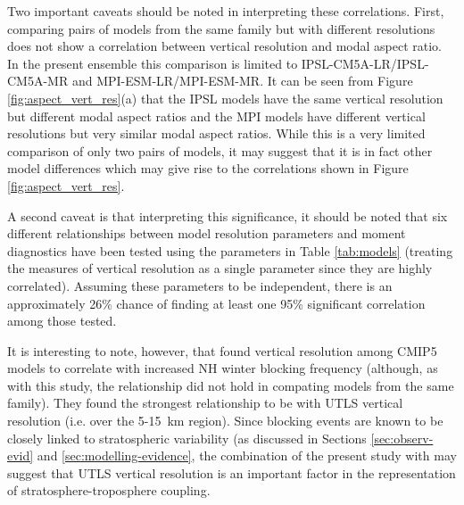 Two important caveats should be noted in interpreting these correlations. First,
comparing pairs of models from the same family but with different resolutions
does not show a correlation between vertical resolution and modal aspect
ratio. In the present ensemble this comparison is limited to
IPSL-CM5A-LR/IPSL-CM5A-MR and MPI-ESM-LR/MPI-ESM-MR. It can be seen from Figure
\ref{fig:aspect_vert_res}(a) that the IPSL models have the same vertical
resolution but different modal aspect ratios and the MPI models have different
vertical resolutions but very similar modal aspect ratios. While this is a very
limited comparison of only two pairs of models, it may suggest that it is in
fact other model differences which may give rise to the correlations shown in
Figure \ref{fig:aspect_vert_res}.

A second caveat is that interpreting this significance, it should be noted that
six different relationships between model resolution parameters and moment
diagnostics have been tested using the parameters in Table \ref{tab:models}
(treating the measures of vertical resolution as a single parameter since they
are highly correlated). Assuming these parameters to be independent, there is an
approximately 26\% chance of finding at least one 95\% significant correlation
among those tested. 

It is interesting to note, however, that \citet{Anstey2013} found vertical
resolution among CMIP5 models to correlate with increased NH winter blocking
frequency (although, as with this study, the relationship did not hold in
compating models from the same family). They found the strongest relationship to
be with UTLS vertical resolution (i.e. over the 5-15~km region). Since blocking
events are known to be closely linked to stratospheric variability (as discussed
in Sections \ref{sec:observ-evid} and \ref{sec:modelling-evidence}, the
combination of the present study with \citet{Anstey2013} may suggest that UTLS
vertical resolution is an important factor in the representation of
stratosphere-troposphere coupling.

